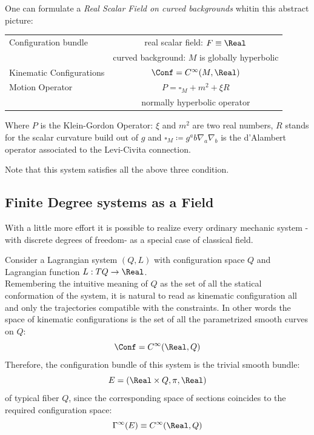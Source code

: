 \documentclass[Main]{subfiles}
\begin{document}
		\begin{example}
		One can formulate a \emph{Real Scalar Field on curved backgrounds} whitin this abstract picture:
			\begin{center}\begin{tabular}{|l|c|}
			\hline
			Configuration bundle & real scalar field: $F \equiv \Real$\\
													& curved background: $M$ is globally hyperbolic\\
			\hline
			Kinematic Configurations & $\Conf = C^\infty(M,\Real)$\\
			\hline
			Motion Operator			&  $P=\square_M + m^2 + \xi R$ \\
													& normally hyperbolic operator\\
			\hline
			\end{tabular}\end{center}
			Where $P$ is the Klein-Gordon Operator: $\xi$ and $m^2$ are two real numbers, $R$ stands for the scalar curvature build out of $g$ and $\square_M \coloneqq g^ab \nabla_a \nabla_b$ is the d'Alambert operator associated to the Levi-Civita connection.	
			
		Note that this system satisfies all the above three condition.
		\end{example}
	



		\subsection{Finite Degree systems as a Field}\label{MechanicsAsAField}
			With a little more effort it is possible to realize every ordinary mechanic system  -with discrete degrees of freedom- as a special case of classical field.
			
			Consider a Lagrangian system $(Q, L)$ with configuration space $Q$ and Lagrangian function $L: TQ\rightarrow \Real$.
			\\
			Remembering the intuitive meaning of $Q$ as the set of all the statical conformation of the system, it is natural to read as kinematic configuration all and only the trajectories compatible with the constraints.
			In other words the space of kinematic configurations is the set of all the parametrized smooth curves on $Q$:
			\begin{displaymath}
				\Conf = C^\infty(\Real,Q)
			\end{displaymath}
			Therefore, the configuration bundle of this system is the trivial smooth bundle:
			\begin{displaymath}
				E= ( \Real\times Q, \pi, \Real)
			\end{displaymath}
			of typical fiber $Q$, since the corresponding space of sections coincides to  the required configuration space:
			\begin{displaymath}
				\Gamma^\infty(E) \equiv C^\infty(\Real,Q)
			\end{displaymath}
\end{document}
